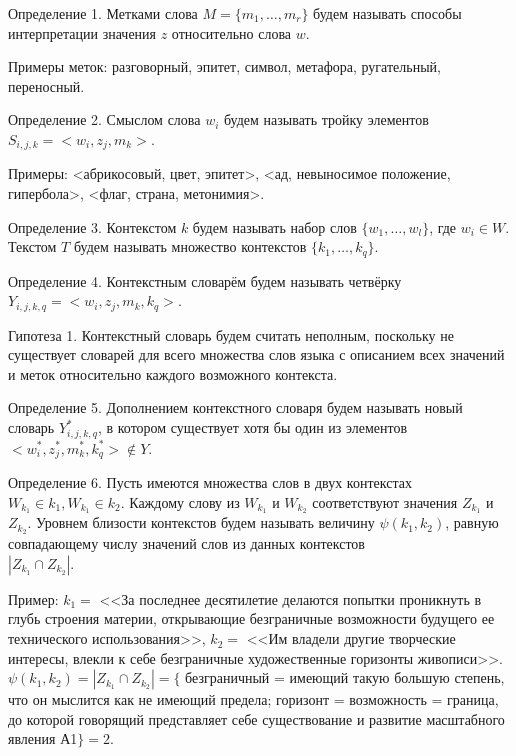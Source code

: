 \documentclass[12pt,twoside]{article}
\begin{document}
Определение 1. Метками слова $M=\{m_1,\ldots,m_r\}$ будем называть способы интерпретации значения $z$ относительно слова $w$.

Примеры меток: разговорный, эпитет, символ, метафора, ругательный, переносный.

Определение 2. Смыслом слова $w_i$ будем называть тройку элементов $S_{i,j,k}=<w_i, z_j, m_k>$. 

Примеры: <абрикосовый, цвет, эпитет>, <ад, невыносимое положение, гипербола>, <флаг, страна, метонимия>.



Определение 3. Контекстом $k$ будем называть набор слов $\{w_1,\ldots,w_l\}$, где $w_i\in W$. Текстом $T$ будем называть множество контекстов $\{k_1,\ldots, k_q\}$.

Определение 4. Контекстным словарём будем называть четвёрку\\ $Y_{i,j,k,q}=<w_i, z_j, m_k, k_q>$.

Гипотеза 1. Контекстный словарь будем считать неполным, поскольку не существует словарей для всего множества слов языка с описанием всех значений и меток относительно каждого возможного контекста.

Определение 5. Дополнением контекстного словаря будем называть новый словарь $Y^*_{i,j,k,q}$, в котором существует хотя бы один из элементов\\ $<w^*_i, z^*_j, m^*_k, k^*_q> \notin Y$.

Определение 6. Пусть имеются множества слов в двух контекстах \\ $W_{k_1} \in k_1, W_{k_1} \in k_2$. Каждому слову из $W_{k_1}$ и $W_{k_2}$ соответствуют значения $Z_{k_1}$ и $Z_{k_2}$. Уровнем близости контекстов будем называть величину $\psi(k_1, k_2)$, равную совпадающему числу значений слов из данных контекстов\\ $|Z_{k_1}\cap Z_{k_2}|$.

Пример: $k_1=$ <<За последнее десятилетие делаются попытки проникнуть в глубь строения материи, открывающие безграничные возможности будущего ее технического использования>>, $k_2=$ <<Им владели другие творческие интересы, влекли к себе безграничные художественные горизонты живописи>>. $\psi(k_1, k_2)=|Z_{k_1}\cap Z_{k_2}|=\{$ безграничный = имеющий такую большую степень, что он мыслится как не имеющий предела; горизонт = возможность = граница, до которой говорящий представляет себе существование и развитие масштабного явления А1$\}=2.$ 
\end{document}
